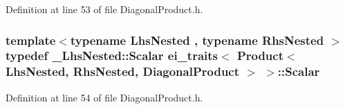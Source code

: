 Definition at line 53 of file Diagonal\-Product.\-h.

\hypertarget{structei__traits_3_01_product_3_01_lhs_nested_00_01_rhs_nested_00_01_diagonal_product_01_4_01_4_ab10484657f1e9ad1e6bcc5450e274e98}{
\subsubsection[{Scalar}]{\setlength{\rightskip}{0pt plus 5cm}template$<$typename Lhs\-Nested , typename Rhs\-Nested $>$ typedef \-\_\-\-Lhs\-Nested\-::\-Scalar {\bf ei\-\_\-traits}$<$ {\bf Product}$<$ Lhs\-Nested, Rhs\-Nested, {\bf Diagonal\-Product} $>$ $>$\-::{\bf Scalar}}}\label{structei__traits_3_01_product_3_01_lhs_nested_00_01_rhs_nested_00_01_diagonal_product_01_4_01_4_ab10484657f1e9ad1e6bcc5450e274e98}


Definition at line 54 of file Diagonal\-Product.\-h.



